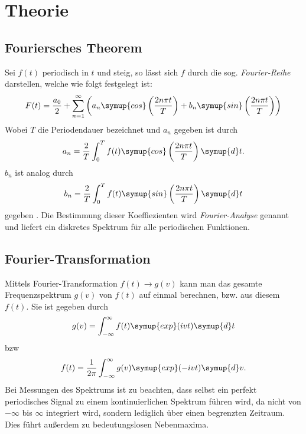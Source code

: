 \section{Theorie}
\label{sec:Theorie}

\subsection{Fouriersches Theorem}
\label{sec:Theorem}
Sei $f(t)$ periodisch in $t$ und steig, so lässt sich $f$ durch die sog. \textit{Fourier-Reihe} darstellen, welche wie folgt festgelegt ist:
\begin{equation}
  F(t)= \frac{a_0}{2} + \sum_{n = 1}^\infty \left( a_n \symup{cos} \left( \frac{2 n \pi t}{T} \right) + b_n \symup{sin} \left( \frac{2 n \pi t}{T} \right) \right)
  \label{eqn:Fourier-Reihe}
\end{equation}
Wobei $T$ die Periodendauer bezeichnet und $a_n$ gegeben ist durch
\begin{equation}
  a_n = \frac{2}{T} \int_0^T f(t) \symup{cos}\left(\frac{2 n \pi t}{T}\right) \symup{d}t .
  \label{eqn:an}
\end{equation}
$b_n$ ist analog durch
\begin{equation}
  b_n = \frac{2}{T} \int_0^T f(t) \symup{sin}\left(\frac{2 n \pi t}{T}\right) \symup{d}t
  \label{eqn:bn}
\end{equation}
gegeben \cite{sample}.
Die Bestimmung dieser Koeffiezienten wird \textit{Fourier-Analyse} genannt und liefert ein diskretes Spektrum für alle periodischen Funktionen.

\subsection{Fourier-Transformation}
\label{sec:Trafo}
Mittels Fourier-Transformation $f(t) \to g(v)$ kann man das gesamte Frequenzspektrum $g(v)$ von $f(t)$ auf einmal berechnen, bzw. aus diesem $f(t)$. Sie ist gegeben durch
\begin{equation}
  g(v) = \int_{-\infty}^{\infty} f(t)\symup{exp}(ivt) \symup{d}t
  \label{eq:trafo}
\end{equation}
bzw
\begin{equation}
  f(t) = \frac{1}{2\pi} \int_{-\infty}^{\infty} g(v)\symup{exp}(-ivt) \symup{d}v.
  \label{eq:backtrafo}
\end{equation}
Bei Messungen des Spektrums ist zu beachten, dass selbst ein perfekt periodisches Signal zu einem kontinuierlichen Spektrum führen wird, da nicht von $-\infty$ bis $\infty$ integriert wird, sondern lediglich über einen begrenzten Zeitraum. Dies führt außerdem zu bedeutungslosen Nebenmaxima.
